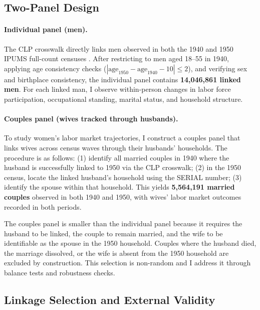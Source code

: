 \documentclass[12pt]{article}
\begin{document}
\subsection{Two-Panel Design}

\paragraph{Individual panel (men).} The CLP crosswalk directly links men observed in both the 1940 and 1950 IPUMS full-count censuses \citep{ruggles2024ipums}. After restricting to men aged 18--55 in 1940, applying age consistency checks ($|\text{age}_{1950} - \text{age}_{1940} - 10| \leq 2$), and verifying sex and birthplace consistency, the individual panel contains \textbf{14,046,861 linked men}. For each linked man, I observe within-person changes in labor force participation, occupational standing, marital status, and household structure.

\paragraph{Couples panel (wives tracked through husbands).} To study women's labor market trajectories, I construct a couples panel that links wives across census waves through their husbands' households. The procedure is as follows: (1) identify all married couples in 1940 where the husband is successfully linked to 1950 via the CLP crosswalk; (2) in the 1950 census, locate the linked husband's household using the SERIAL number; (3) identify the spouse within that household. This yields \textbf{5,564,191 married couples} observed in both 1940 and 1950, with wives' labor market outcomes recorded in both periods.

The couples panel is smaller than the individual panel because it requires the husband to be linked, the couple to remain married, and the wife to be identifiable as the spouse in the 1950 household. Couples where the husband died, the marriage dissolved, or the wife is absent from the 1950 household are excluded by construction. This selection is non-random and I address it through balance tests and robustness checks.

\subsection{Linkage Selection and External Validity}
\end{document}
